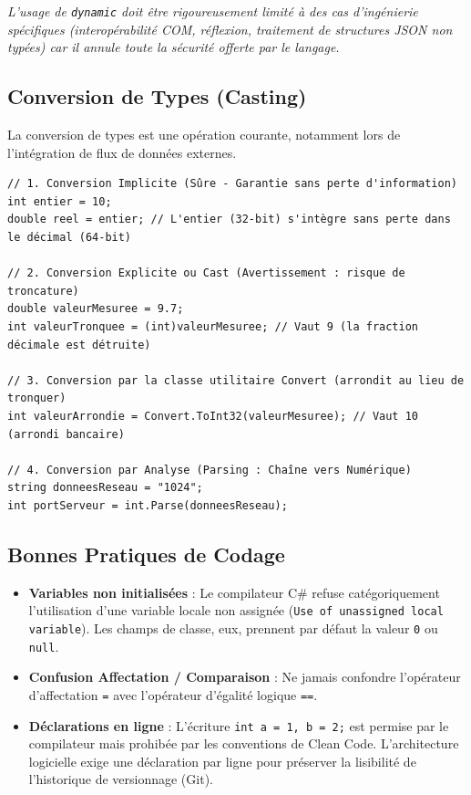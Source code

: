 \textit{L'usage de \texttt{dynamic} doit être rigoureusement limité à des cas d'ingénierie spécifiques (interopérabilité COM, réflexion, traitement de structures JSON non typées) car il annule toute la sécurité offerte par le langage.}

\subsection{Conversion de Types (Casting)}

La conversion de types est une opération courante, notamment lors de l'intégration de flux de données externes.

\begin{lstlisting}[caption={Mécanismes de conversion en C\#}]
// 1. Conversion Implicite (Sûre - Garantie sans perte d'information)
int entier = 10;
double reel = entier; // L'entier (32-bit) s'intègre sans perte dans le décimal (64-bit)

// 2. Conversion Explicite ou Cast (Avertissement : risque de troncature)
double valeurMesuree = 9.7;
int valeurTronquee = (int)valeurMesuree; // Vaut 9 (la fraction décimale est détruite)

// 3. Conversion par la classe utilitaire Convert (arrondit au lieu de tronquer)
int valeurArrondie = Convert.ToInt32(valeurMesuree); // Vaut 10 (arrondi bancaire)

// 4. Conversion par Analyse (Parsing : Chaîne vers Numérique)
string donneesReseau = "1024";
int portServeur = int.Parse(donneesReseau); 
\end{lstlisting}

\subsection{Bonnes Pratiques de Codage}

\begin{tcolorbox}[colback=white,colframe=stringcolor,title=\textbf{Règles strictes de développement C\#}]
    \begin{itemize}
        \item \textbf{Variables non initialisées} : Le compilateur C\# refuse catégoriquement l'utilisation d'une variable locale non assignée (\texttt{Use of unassigned local variable}). Les champs de classe, eux, prennent par défaut la valeur \texttt{0} ou \texttt{null}.
        \item \textbf{Confusion Affectation / Comparaison} : Ne jamais confondre l'opérateur d'affectation \texttt{=} avec l'opérateur d'égalité logique \texttt{==}.
        \item \textbf{Déclarations en ligne} : L'écriture \texttt{int a = 1, b = 2;} est permise par le compilateur mais prohibée par les conventions de Clean Code. L'architecture logicielle exige une déclaration par ligne pour préserver la lisibilité de l'historique de versionnage (Git).
    \end{itemize}
\end{tcolorbox}
